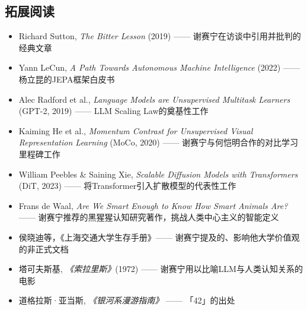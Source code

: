 \documentclass[a4paper]{article}
\begin{document}
\subsection{拓展阅读}

\begin{itemize}
  \item Richard Sutton, \textit{The Bitter Lesson} (2019) —— 谢赛宁在访谈中引用并批判的经典文章
  \item Yann LeCun, \textit{A Path Towards Autonomous Machine Intelligence} (2022) —— 杨立昆的JEPA框架白皮书
  \item Alec Radford et al., \textit{Language Models are Unsupervised Multitask Learners} (GPT-2, 2019) —— LLM Scaling Law的奠基性工作
  \item Kaiming He et al., \textit{Momentum Contrast for Unsupervised Visual Representation Learning} (MoCo, 2020) —— 谢赛宁与何恺明合作的对比学习里程碑工作
  \item William Peebles \& Saining Xie, \textit{Scalable Diffusion Models with Transformers} (DiT, 2023) —— 将Transformer引入扩散模型的代表性工作
  \item Frans de Waal, \textit{Are We Smart Enough to Know How Smart Animals Are?} —— 谢赛宁推荐的黑猩猩认知研究著作，挑战人类中心主义的智能定义
  \item 侯晓迪等，《上海交通大学生存手册》—— 谢赛宁提及的、影响他大学价值观的非正式文档
  \item 塔可夫斯基, \textit{《索拉里斯》}(1972) —— 谢赛宁用以比喻LLM与人类认知关系的电影
  \item 道格拉斯·亚当斯, \textit{《银河系漫游指南》} —— 「42」的出处
\end{itemize}
\end{document}
